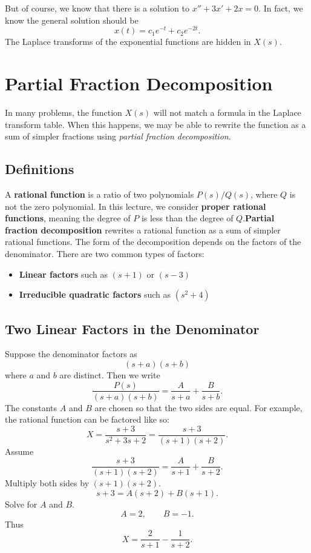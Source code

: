 \documentclass[10pt,letterpaper]{article}
\begin{document}
But of course, we know that there is a solution to $x''+3x'+2x=0$. In fact, we know the general solution should be 
$$
    x(t) = c_1 e^{-t}+c_2e^{-2t}.
$$
The Laplace transforms of the exponential functions are hidden in $X(s)$.

\section{Partial Fraction Decomposition}

In many problems, the function $X(s)$ will not match a formula in the Laplace transform table. When this happens, we may be able to rewrite the function as a sum of simpler fractions using \textit{partial fraction decomposition}.

\subsection{Definitions}
A \textbf{rational function} is a ratio of two polynomials
$P(s)/Q(s)$, where $Q$ is not the zero polynomial.
In this lecture, we consider \textbf{proper rational functions},
meaning the degree of $P$ is less than the degree of $Q$.\textbf{Partial fraction decomposition} rewrites a rational function as a sum of simpler rational functions.
The form of the decomposition depends on the factors of the denominator.
There are two common types of factors:
\begin{itemize}
\item \textbf{Linear factors} such as $(s+1)$ or $(s-3)$
\item \textbf{Irreducible quadratic factors} such as $(s^2+4)$
\end{itemize}


\subsection{Two Linear Factors in the Denominator}
Suppose the denominator factors as
\[
(s+a)(s+b)
\]
where $a$ and $b$ are distinct. Then we write
\[
\frac{P(s)}{(s+a)(s+b)}
=
\frac{A}{s+a}+\frac{B}{s+b}.
\]
The constants $A$ and $B$ are chosen so that the two sides are equal. For example, the rational function can be factored like so:
\[
X=\frac{s+3}{s^2+3s+2}
=
\frac{s+3}{(s+1)(s+2)}.
\]
Assume
\[
\frac{s+3}{(s+1)(s+2)}
=
\frac{A}{s+1}+\frac{B}{s+2}.
\]
Multiply both sides by $(s+1)(s+2)$.
\[
s+3=A(s+2)+B(s+1).
\]
Solve for $A$ and $B$.
\[
A=2, \qquad B=-1.
\]
Thus
\[
X=\frac{2}{s+1}-\frac{1}{s+2}.
\]
\end{document}
